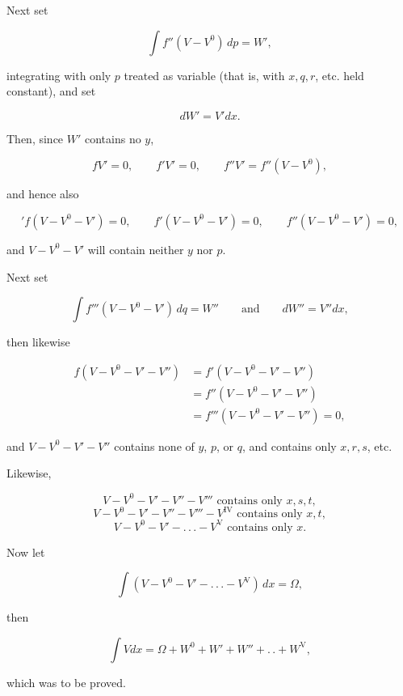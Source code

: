 Next set

\[
\int f''(V - V^0)\,dp = W',
\]

\noindent integrating with only $p$ treated as variable (that is, with $x, q, r$, etc. held constant), and set

\[
dW' = V'dx.
\]

\noindent Then, since $W'$ contains no $y$,

\[
fV' = 0, \qquad f'V' = 0, \qquad f''V' = f''(V - V^0),
\]

\noindent and hence also

\[
{}'f(V - V^0 - V') = 0, \qquad f'(V - V^0 - V') = 0, \qquad f''(V - V^0 - V') = 0,
\]

\noindent and $V - V^0 - V'$ will contain neither $y$ nor $p$.

Next set

\[
\int f'''(V - V^0 - V')\,dq = W'' \qquad \text{and} \qquad dW'' = V''dx,
\]

\noindent then likewise

\[
\begin{aligned}f(V - V^0 - V' - V'') &={} f'(V - V^0 - V' - V'')\\ &={} f''(V - V^0 - V' - V'')\\ &={} f'''(V - V^0 - V' - V'') = 0,\end{aligned}
\]

\noindent and $V - V^0 - V' - V''$ contains none of $y$, $p$, or $q$, and contains only $x, r, s$, etc.

Likewise,

\[
V - V^0 - V' - V'' - V''' \text{ contains only } x, s, t,
\]
\[
V - V^0 - V' - V'' - V''' - V^{\mathrm{IV}} \text{ contains only } x, t,
\]
\[
V - V^0 - V' - .\,.\,. - V^{\mathrm{V}} \text{ contains only } x.
\]

\noindent Now let

\[
\int (V - V^0 - V' - .\,.\,. - V^{\mathrm{V}})\,dx = \Omega,
\]

\noindent then

\[
\int V dx = \Omega + W^0 + W' + W'' + .\,. + W^{\mathrm{V}},
\]

\noindent which was to be proved.


